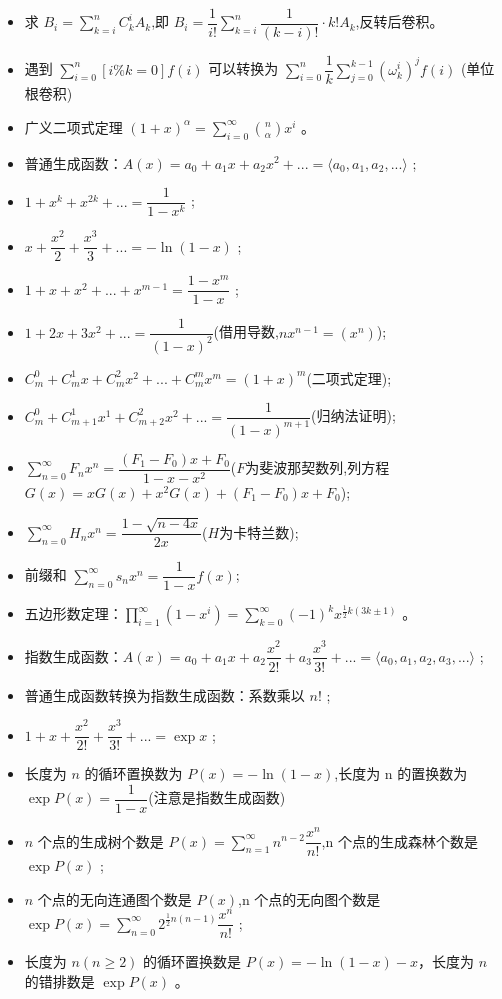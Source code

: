 \begin{itemize}
    \item 求 $\displaystyle B_i = \sum_{k=i}^n C_k^iA_k$,即 $\displaystyle B_i=\dfrac{1}{i!}\sum_{k=i}^n\dfrac{1}{(k-i)!}\cdot k!A_k$,反转后卷积。
    \item 遇到 $\displaystyle \sum_{i=0}^n[i\%k=0]f(i)$ 可以转换为 $\displaystyle \sum_{i=0}^n\dfrac 1 k\sum_{j=0}^{k-1}(\omega_k^i)^jf(i)$ (单位根卷积)
    \item 广义二项式定理 $\displaystyle (1+x)^{\alpha}=\sum_{i=0}^{\infty}{n\choose \alpha}x^i$ 。
    \item 普通生成函数：$A(x)=a_0+a_1x+a_2x^2+...=\langle a_0,a_1,a_2,...\rangle$ ;
    \item $1+x^k+x^{2k}+...=\dfrac{1}{1-x^k}$ ;
    \item $x+\dfrac{x^2}{2}+\dfrac{x^3}{3}+...=-\ln(1-x)$ ;
    \item $1+x+x^2+...+x^{m-1}=\dfrac{1-x^m}{1-x}$ ;
    \item $1+2x+3x^2+...=\dfrac{1}{(1-x)^2}$(借用导数,$nx^{n-1}=(x^n)$);
    \item $C_m^0+C_m^1x+C_m^2x^2+...+C_m^mx^m=(1+x)^m$(二项式定理);
    \item $C_m^0+C_{m+1}^1x^1+C_{m+2}^2x^2+...=\dfrac{1}{(1-x)^{m+1}}$(归纳法证明);
    \item $\displaystyle\sum_{n=0}^{\infty}F_nx^n=\dfrac{(F_1-F_0)x+F_0}{1-x-x^2}$($F$为斐波那契数列,列方程 $G(x)=xG(x)+x^2G(x)+(F_1-F_0)x+F_0$);
    \item $\displaystyle\sum_{n=0}^{\infty} H_nx^n=\dfrac{1-\sqrt{n-4x}}{2x}$($H$为卡特兰数);
    \item 前缀和 $\displaystyle \sum_{n=0}^{\infty}s_nx^n=\dfrac{1}{1-x}f(x)$;
    \item 五边形数定理：$\displaystyle \prod_{i=1}^{\infty}(1-x^i)=\sum_{k=0}^{\infty}(-1)^kx^{\frac 1 2k(3k\pm 1)}$ 。
    \item 指数生成函数：$A(x)=a_0+a_1x+a_2\dfrac{x^2}{2!}+a_3\dfrac{x^3}{3!}+...=\langle a_0,a_1,a_2,a_3,...\rangle$ ;
    \item 普通生成函数转换为指数生成函数：系数乘以 $n!$ ;
    \item $1+x+\dfrac{x^2}{2!}+\dfrac{x^3}{3!}+...=\exp x$ ;
    \item 长度为 $n$ 的循环置换数为 $P(x)=-\ln(1-x)$,长度为 n 的置换数为 $\exp P(x)=\dfrac{1}{1-x}$(注意是指数生成函数)
    \item $n$ 个点的生成树个数是 $\displaystyle P(x)=\sum_{n=1}^{\infty}n^{n-2}\dfrac{x^n}{n!}$,n 个点的生成森林个数是 $\exp P(x)$ ;
    \item $n$ 个点的无向连通图个数是 $P(x)$,n 个点的无向图个数是 $\displaystyle\exp P(x)=\sum_{n=0}^{\infty}2^{\frac 1 2 n(n-1)}\dfrac{x^n}{n!}$ ;
    \item 长度为 $n(n\ge 2)$ 的循环置换数是 $P(x)=-\ln(1-x)-x$，长度为 $n$ 的错排数是 $\exp P(x)$ 。
\end{itemize}



